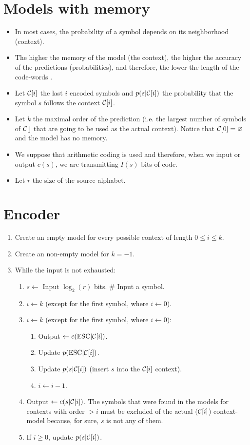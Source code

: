 \section{Models with memory}
\begin{itemize}
\item In most cases, the probability of a symbol depends on its
  neighborhood (context).
\item The higher the memory of the model (the context), the higher the
  accuracy of the predictions (probabilities), and therefore, the
  lower the length of the code-words \cite{cleary1984data}.
\item Let ${\cal C}[i]$ the last $i$ encoded symbols and $p(s|{\cal C}[i])$ the
  probability that the symbol $s$ follows the context ${\cal C}[i]$.
\item Let $k$ the maximal order of the prediction (i.e. the largest
  number of symbols of ${\cal C}[]$ that are going to be used as the
  actual context). Notice that ${\cal C}[0]=\varnothing$ and the model
  has no memory.
\item We suppose that arithmetic coding is used and therefore, when we
  input or output $c(s)$, we are transmitting $I(s)$ bits of code.
\item Let $r$ the size of the source alphabet.
\end{itemize}

\section{Encoder}
\begin{enumerate}
\item Create an empty model for every possible context of length $0\le i \le k$.
\item Create an non-empty model for $k=-1$.
\item While the input is not exhausted:
  \begin{enumerate}
  \item $s\leftarrow$ Input ${\log_2(r)}$ bits. \# Input a symbol.
  \item $i\leftarrow k$ (except for the first symbol, where
    $i\leftarrow 0$).
  \item $i\leftarrow k$ (except for the first symbol, where
    $i\leftarrow 0$):
    \begin{enumerate}
    \item Output $\leftarrow c(\text{ESC}|{\cal C}[i])$.
    \item Update $p(\text{ESC}|{\cal C}[i])$.
    \item Update $p(s|{\cal C}[i])$ (insert $s$ into the ${\cal C}[i]$ context).
    \item $i\leftarrow i-1$.
    \end{enumerate}
  \item Output $\leftarrow c(s|{\cal C}[i])$. The symbols that were found in the models for
       contexts with order $>i$ must be excluded of the actual (${\cal C}[i]$) context-model because, for sure, $s$ is not any of them.
  \item If $i\ge 0$, update $p(s|{\cal C}[i])$.
  \end{enumerate}
\end{enumerate}

